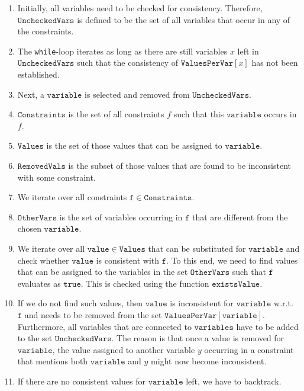 \begin{enumerate}
\item Initially, all variables need to be checked for consistency.  Therefore, $\mathtt{UncheckedVars}$
      is defined to be the set of all variables that occur in any of the constraints.
\item The \texttt{while}-loop iterates as long as there are still variables $x$ left in $\mathtt{UncheckedVars}$
      such that the consistency of $\mathtt{ValuesPerVar}[x]$ has not been established.
\item Next, a $\mathtt{variable}$ is selected and removed from $\mathtt{UncheckedVars}$. 
\item $\mathtt{Constraints}$ is the set of all constraints $f$ such that this $\mathtt{variable}$ occurs in $f$.
\item $\mathtt{Values}$ is the set of those values that can be assigned to $\mathtt{variable}$.
\item $\mathtt{RemovedVals}$ is the subset of those values that are found to be inconsistent with some constraint.
\item We iterate over all constraints $\mathtt{f} \in \mathtt{Constraints}$.
\item $\mathtt{OtherVars}$ is the set of variables occurring in $\mathtt{f}$ that are different from 
      the chosen $\mathtt{variable}$.
\item We iterate over all $\mathtt{value} \in \mathtt{Values}$ that can be substituted for $\mathtt{variable}$
      and check whether $\mathtt{value}$ is consistent with $\mathtt{f}$.   To this end, we need to find values
      that can be assigned to the variables in the set $\mathtt{OtherVars}$ such that $\mathtt{f}$ evaluates as
      $\mathtt{true}$.  This is checked using the function $\mathtt{existsValue}$.
\item If we do not find such values, then $\mathtt{value}$ is inconsistent for
      $\mathtt{variable}$ w.r.t.~$\mathtt{f}$ and needs to be removed from the set 
      $\mathtt{ValuesPerVar}[\mathtt{variable}]$.  Furthermore, all variables that are connected to
      $\mathtt{variables}$ have to be added to the set $\mathtt{UncheckedVars}$.  The reason is that once a
      value is removed for $\mathtt{variable}$, the value assigned to another variable $y$ occurring in a
      constraint that mentions both $\mathtt{variable}$ and $y$ might now become inconsistent.
\item If there are no consistent values for $\mathtt{variable}$ left, we have to backtrack.
\end{enumerate}

